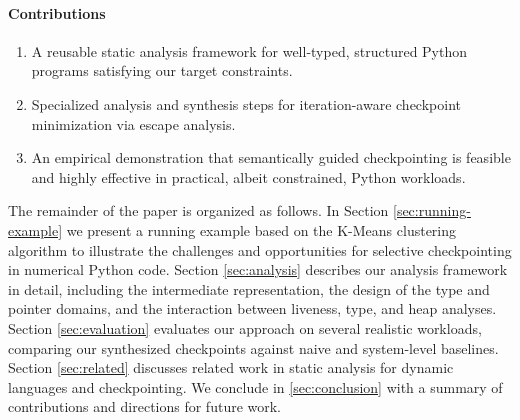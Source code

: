 \paragraph{Contributions}
\begin{enumerate}
\item A reusable static analysis framework for well-typed, structured Python programs satisfying our target constraints.
\item Specialized analysis and synthesis steps for iteration-aware checkpoint minimization via escape analysis.
\item An empirical demonstration that semantically guided checkpointing is feasible and highly effective in practical, albeit constrained, Python workloads.
\end{enumerate}

The remainder of the paper is organized as follows. In Section \ref{sec:running-example} we present a running example based on the K-Means clustering algorithm to illustrate the challenges and opportunities for selective checkpointing in numerical Python code. Section \ref{sec:analysis} describes our analysis framework in detail, including the intermediate representation, the design of the type and pointer domains, and the interaction between liveness, type, and heap analyses. Section \ref{sec:evaluation} evaluates our approach on several realistic workloads, comparing our synthesized checkpoints against naive and system-level baselines. Section \ref{sec:related} discusses related work in static analysis for dynamic languages and checkpointing. We conclude in \ref{sec:conclusion} with a summary of contributions and directions for future work.
